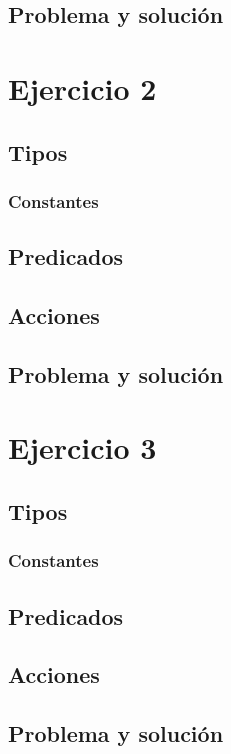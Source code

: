 \subsection{Problema y solución}

\section{Ejercicio 2}

\subsection{Tipos}
\subsubsection{Constantes}
\subsection{Predicados}
\subsection{Acciones}
\subsection{Problema y solución}

\section{Ejercicio 3}

\subsection{Tipos}
\subsubsection{Constantes}
\subsection{Predicados}
\subsection{Acciones}
\subsection{Problema y solución}

